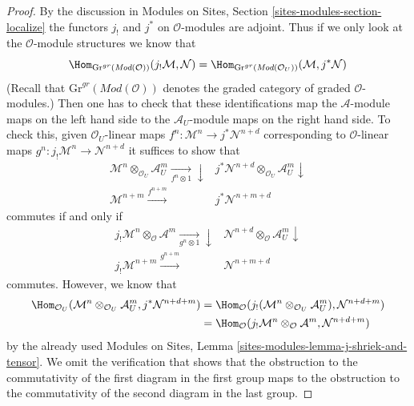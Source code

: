 \begin{proof}
By the discussion in
Modules on Sites, Section \ref{sites-modules-section-localize}
the functors $j_!$ and $j^*$ on $\mathcal{O}$-modules are adjoint.
Thus if we only look at the $\mathcal{O}$-module structures
we know that
$$
\Hom_{\text{Gr}^{gr}(\textit{Mod}(\mathcal{O}))}(
j_!\mathcal{M}, \mathcal{N}) =
\Hom_{\text{Gr}^{gr}(\textit{Mod}(\mathcal{O}_U))}(
\mathcal{M}, j^*\mathcal{N})
$$
(Recall that $\text{Gr}^{gr}(\textit{Mod}(\mathcal{O}))$ denotes
the graded category of graded $\mathcal{O}$-modules.)
Then one has to check that these identifications map the
$\mathcal{A}$-module maps on the left hand side to the
$\mathcal{A}_U$-module maps on the right hand side.
To check this, given $\mathcal{O}_U$-linear maps
$f^n : \mathcal{M}^n \to j^*\mathcal{N}^{n + d}$
corresponding to $\mathcal{O}$-linear maps
$g^n : j_!\mathcal{M}^n \to \mathcal{N}^{n + d}$
it suffices to show that
$$
\begin{array}{cc}\mathcal{M}^n \otimes_{\mathcal{O}_U} \mathcal{A}_U^m
\underset{f^n \otimes 1}{\longrightarrow}\downarrow & j^*\mathcal{N}^{n + d} \otimes_{\mathcal{O}_U} \mathcal{A}_U^m \downarrow \\ \mathcal{M}^{n + m} \overset{f^{n + m}}{\longrightarrow} & j^*\mathcal{N}^{n + m + d}\end{array}
$$
commutes if and only if
$$
\begin{array}{cc}j_!\mathcal{M}^n \otimes_\mathcal{O} \mathcal{A}^m
\underset{g^n \otimes 1}{\longrightarrow}\downarrow & \mathcal{N}^{n + d} \otimes_\mathcal{O} \mathcal{A}_U^m \downarrow \\ j_!\mathcal{M}^{n + m} \overset{g^{n + m}}{\longrightarrow} & \mathcal{N}^{n + m + d}\end{array}
$$
commutes. However, we know that
\begin{align*}
\Hom_{\mathcal{O}_U}(\mathcal{M}^n \otimes_{\mathcal{O}_U} \mathcal{A}_U^m,
j^*\mathcal{N}^{n + d + m})
& =
\Hom_\mathcal{O}(j_!(\mathcal{M}^n \otimes_{\mathcal{O}_U} \mathcal{A}_U^m),
\mathcal{N}^{n + d + m}) \\
& =
\Hom_\mathcal{O}(j_!\mathcal{M}^n \otimes_\mathcal{O} \mathcal{A}^m,
\mathcal{N}^{n + d + m})
\end{align*}
by the already used
Modules on Sites, Lemma \ref{sites-modules-lemma-j-shriek-and-tensor}.
We omit the verification that shows that the obstruction to the
commutativity of the first diagram in the first group maps
to the obstruction to the commutativity of the second diagram
in the last group.
\end{proof}

